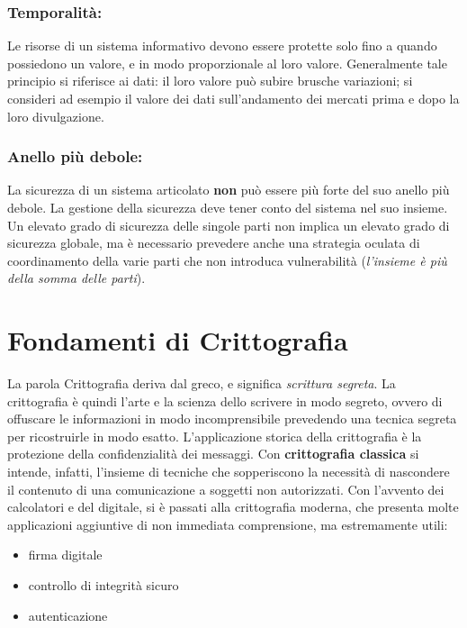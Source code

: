 \subsubsection{Temporalità:}  Le risorse di un sistema informativo devono essere protette solo fino a quando possiedono un valore, e in modo proporzionale al loro valore. Generalmente tale principio si riferisce ai dati: il loro valore può subire brusche variazioni; si consideri ad esempio il valore dei dati sull’andamento dei mercati prima e dopo la loro divulgazione.

\subsubsection{Anello più debole:}  La sicurezza di un sistema articolato \textbf{non} può essere più forte del suo anello più debole. La gestione della sicurezza deve tener conto del sistema nel suo insieme. Un elevato grado di sicurezza delle singole parti non implica un elevato grado di sicurezza globale, ma è necessario prevedere anche una strategia oculata di coordinamento della varie parti che non introduca vulnerabilità  (\textit{l'insieme è più della somma delle parti}).

\section{Fondamenti di Crittografia}
La parola Crittografia deriva dal greco, e significa \textit{scrittura segreta}. La crittografia è quindi l'arte e la scienza dello scrivere in modo segreto, ovvero di offuscare le informazioni in modo incomprensibile prevedendo una tecnica segreta per ricostruirle in modo esatto. L'applicazione storica della crittografia è la protezione della confidenzialità dei messaggi. Con \textbf{crittografia classica} si intende, infatti, l'insieme di tecniche che sopperiscono la necessità di nascondere il contenuto di una comunicazione a soggetti non autorizzati. Con l'avvento dei calcolatori e del digitale, si è passati alla crittografia moderna, che presenta molte applicazioni aggiuntive di non immediata comprensione, ma estremamente utili:
\begin{itemize} 
  \item firma digitale
  \item controllo di integrità sicuro
  \item autenticazione
\end{itemize}

